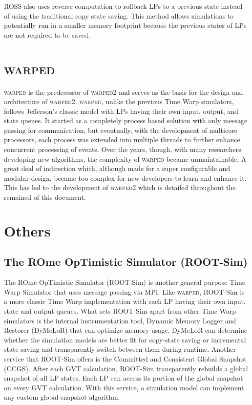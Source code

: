 \documentclass[11pt]{book}
\begin{document}
ROSS also uses reverse computation \cite{carothers-99} to rollback LPs to a previous state
instead of using the traditional copy state saving.  This method allows simulations to
potentially run in a smaller memory footprint because the previous states of LPs are not
required to be saved.

\section{\textsc{warped}}

\textsc{warped} \cite{martin-96,ramanan-98-iscope} is the predecessor of \textsc{warped2}
and serves as the basis for the design and architecture of \textsc{warped2}.
\textsc{warped}, unlike the previous Time Warp simulators, follows Jefferson's classic
model with LPs having their own input, output, and state queues.  It started as a
completely process based solution with only message passing for communication, but
eventually, with the development of multicore processors, each process was extended into
multiple threads to further enhance concurrent processing of events.  Over the years,
though, with many researchers developing new algorithms, the complexity of \textsc{warped}
became unmaintainable.  A great deal of indirection which, although made for a super
configurable and modular design, became too complex for new developers to learn and
enhance it.  This has led to the development of \textsc{warped2} which is detailed
throughout the remained of this document.

\section{Others}

\subsection{The ROme OpTimistic Simulator (ROOT-Sim)}

The ROme OpTimistic Simulator \cite{pellegrini-11} (ROOT-Sim) is another general purpose
Time Warp Simulator that uses message passing via MPI.  Like \textsc{warped}, ROOT-Sim is
a more classic Time Warp implementation with each LP having their own input, state and
output queues.  What sets ROOT-Sim apart from other Time Warp simulators is the internal
instrumentation tool, Dynamic Memory Logger and Restorer (DyMeLoR) that can optimize
memory usage.  DyMeLoR can determine whether the simulation models are better fit for
copy-state saving or incremental state saving and transparently switch between them during
runtime.  Another service that ROOT-Sim offers is the Committed and Consistent Global
Snapshot (CCGS).  After each GVT calculation, ROOT-Sim transparently rebuilds a global
snapshot of all LP states.  Each LP can access its portion of the global snapshot on every
GVT calculation.  With this service, a simulation model can implement any custom global
snapshot algorithm.
\end{document}
